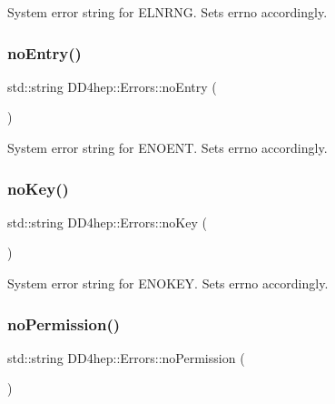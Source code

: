 System error string for E\+L\+N\+R\+NG. Sets errno accordingly. 

\hypertarget{namespace_d_d4hep_1_1_errors_aca021db58d08e5935eea31a7d0b7d1b7}{}\label{namespace_d_d4hep_1_1_errors_aca021db58d08e5935eea31a7d0b7d1b7} 
\subsubsection{\texorpdfstring{no\+Entry()}{noEntry()}}
{\footnotesize\ttfamily std\+::string D\+D4hep\+::\+Errors\+::no\+Entry (\begin{DoxyParamCaption}{ }\end{DoxyParamCaption})}



System error string for E\+N\+O\+E\+NT. Sets errno accordingly. 

\hypertarget{namespace_d_d4hep_1_1_errors_ace8817a7446265e17083aa87e73d6019}{}\label{namespace_d_d4hep_1_1_errors_ace8817a7446265e17083aa87e73d6019} 
\subsubsection{\texorpdfstring{no\+Key()}{noKey()}}
{\footnotesize\ttfamily std\+::string D\+D4hep\+::\+Errors\+::no\+Key (\begin{DoxyParamCaption}{ }\end{DoxyParamCaption})}



System error string for E\+N\+O\+K\+EY. Sets errno accordingly. 

\hypertarget{namespace_d_d4hep_1_1_errors_aa34e378024a1269ccd3f23a0c9d9607b}{}\label{namespace_d_d4hep_1_1_errors_aa34e378024a1269ccd3f23a0c9d9607b} 
\subsubsection{\texorpdfstring{no\+Permission()}{noPermission()}}
{\footnotesize\ttfamily std\+::string D\+D4hep\+::\+Errors\+::no\+Permission (\begin{DoxyParamCaption}{ }\end{DoxyParamCaption})}



